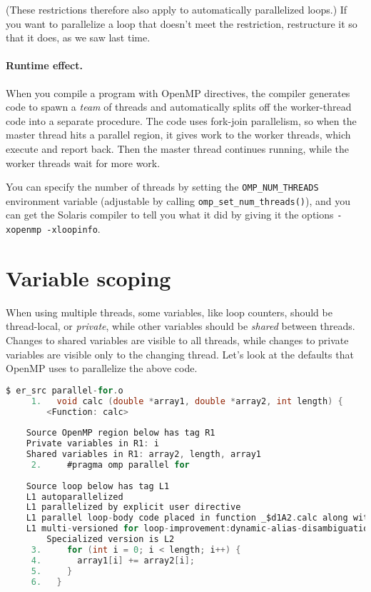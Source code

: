 (These restrictions therefore also apply to automatically parallelized
loops.) If you want to parallelize a loop that doesn't meet the 
restriction, restructure it so that it does, as we saw last time.

\paragraph{Runtime effect.} When you compile a program with 
OpenMP directives, the compiler generates code to spawn a \emph{team}
of threads and automatically splits off the worker-thread code into a
separate procedure. The code uses fork-join parallelism, so when the
master thread hits a parallel region, it gives work to the worker
threads, which execute and report back. Then the master thread
continues running, while the worker threads wait for more work.

You can specify the number of threads by setting the
\verb+OMP_NUM_THREADS+ environment variable (adjustable by calling 
\verb+omp_set_num_threads()+), and you can get the
Solaris compiler to tell you what it did by giving it the
options \verb+-xopenmp -xloopinfo+.

\section*{Variable scoping}
When using multiple threads, some variables, like loop counters,
should be thread-local, or \emph{private}, while other variables
should be \emph{shared} between threads. Changes to shared variables
are visible to all threads, while changes to private variables are
visible only to the changing thread. Let's look at the defaults that
OpenMP uses to parallelize the above code.

{ 
\begin{lstlisting}[language=C,morekeywords={foreach,pragma,omp,parallel,single,nowait,task,untied,barrier,taskyield}]
$ er_src parallel-for.o
     1.   void calc (double *array1, double *array2, int length) {
        <Function: calc>
    
    Source OpenMP region below has tag R1
    Private variables in R1: i
    Shared variables in R1: array2, length, array1
     2.     #pragma omp parallel for
    
    Source loop below has tag L1
    L1 autoparallelized
    L1 parallelized by explicit user directive
    L1 parallel loop-body code placed in function _$d1A2.calc along with 0 inner loops
    L1 multi-versioned for loop-improvement:dynamic-alias-disambiguation. 
        Specialized version is L2
     3.     for (int i = 0; i < length; i++) {
     4.       array1[i] += array2[i];
     5.     }
     6.   }
\end{lstlisting}
}

